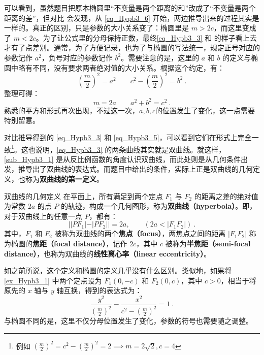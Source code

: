 可以看到，虽然题目把原本椭圆里“不变量是两个距离的和”改成了“不变量是两个距离的差”，但对比  会发现，从 \autoref{eq_Hypb3_6} 开始，两边推导出来的过程其实是一样的。真正的区别，只是参数的大小关系变了：椭圆里是 $m>2c$，而这里变成了 $m<2c$。为了让公式里的分母保持正数，最终\autoref{eq_Hypb3_3} 和  的样子看上去才有了点差别。通常，为了方便记录，也为了与椭圆的写法统一，规定正号对应的参数记作 $a^2$，负号对应的参数记作 $b^2$。需要注意的是，这里的 $a$ 和 $b$ 的定义与椭圆中略有不同，没有要求两者绝对值的大小关系。根据这个约定，有：
\begin{equation}\label{eq_Hypb3_10}
\left(\displaystyle\frac{m}{2}\right)^2=a^2\qquad c^2-\displaystyle\left(\frac{m}{2}\right)^2=b^2~.
\end{equation}
整理可得：
\begin{equation}\label{eq_Hypb3_12}
m=2a\qquad a^2+b^2=c^2~.
\end{equation}
熟悉的平方和形式再次出现，不过这一次，$a,b,c$的位置发生了变化，这一点需要特别留意。

对比推导得到的 \autoref{eq_Hypb3_3} 和 \autoref{eq_Hypb3_5}，可以看到它们在形式上完全一致\footnote{例如 $\displaystyle\left( \frac{m}{2} \right)^2 = c^2 - \left( \frac{m}{2} \right)^2 = 2\implies m = 2\sqrt{2}, c = 4$}。这也说明，\autoref{eq_Hypb3_3} 的两条曲线其实就是双曲线。就这样，\autoref{sub_Hypb3_1} 是从反比例函数的角度认识双曲线，而此处则是从几何条件出发，推导出了双曲线的表达式。而题目中给出的条件，实际上正是双曲线的几何定义，也称为\textbf{双曲线的第一定义}。

\begin{definition}{双曲线的几何定义}
在平面上，所有满足到两个定点 $F_1$ 与 $F_2$ 的距离之差的绝对值为常数 $2a$ 的点 $P$ 的轨迹，构成一个几何图形，称为\textbf{双曲线（hyperbola）}。即，对于双曲线上的任意一点 $P$，都有：
\begin{equation}
||PF_1| - |PF_2|| = 2a ,\qquad(2a<|F_1F_2|)~.
\end{equation}
其中，$F_1$ 和 $F_2$ 被称为双曲线的两个\textbf{焦点（focus）}，两焦点之间的距离 $|F_1F_2|$ 称为椭圆的\textbf{焦距（focal distance）}，记作 $2c$，其中 $c$ 被称为\textbf{半焦距（semi-focal distance）}，也称为双曲线的\textbf{线性离心率（linear eccentricity）}。
\end{definition}

如之前所说，这个定义和椭圆的定义几乎没有什么区别。类似地，如果将 \autoref{ex_Hypb3_1} 中两个定点设为 $F_1(0,-c)$ 和 $F_2(0,c)$，其中 $c>0$，相当于将原先的 $x$ 轴与 $y$ 轴互换，得到的表达式为：
\begin{equation}\label{eq_Hypb3_7}
\frac{y^2}{\left(\displaystyle\frac{m}{2}\right)^2}-\frac{x^2}{\displaystyle c^2-\left(\frac{m}{2}\right)^2} =1~.
\end{equation}
与椭圆不同的是，这里不仅分母位置发生了变化，参数的符号也需要随之调整。

